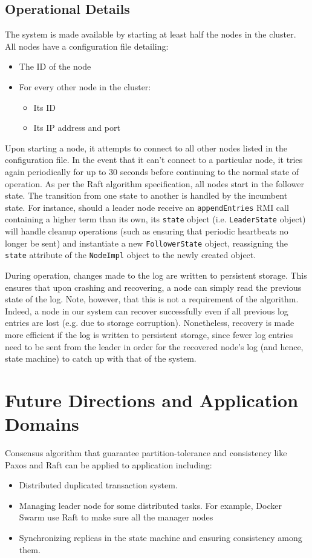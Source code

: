\documentclass[12pt, a4paper]{article}
\begin{document}
\subsection{Operational Details}
The system is made available by starting at least half the nodes in the cluster. All nodes have a configuration file detailing:
\begin{itemize}
    \item The ID of the node
    \item For every other node in the cluster:
    \begin{itemize}
        \item Its ID
        \item Its IP address and port
    \end{itemize}
\end{itemize}
Upon starting a node, it attempts to connect to all other nodes listed in the configuration file. In the event that it can't connect to a particular node, it tries again periodically for up to 30 seconds before continuing to the normal state of operation. As per the Raft algorithm specification, all nodes start in the follower state. The transition from one state to another is handled by the incumbent state. For instance, should a leader node receive an \texttt{appendEntries} RMI call containing a higher term than its own, its \texttt{state} object (i.e. \texttt{LeaderState} object) will handle cleanup operations (such as ensuring that periodic heartbeats no longer be sent) and instantiate a new \texttt{FollowerState} object, reassigning the \texttt{state} attribute of the \texttt{NodeImpl} object to the newly created object.

During operation, changes made to the log are written to persistent storage. This ensures that upon crashing and recovering, a node can simply read the previous state of the log. Note, however, that this is not a requirement of the algorithm. Indeed, a node in our system can recover successfully even if all previous log entries are lost (e.g. due to storage corruption). Nonetheless, recovery is made more efficient if the log is written to persistent storage, since fewer log entries need to be sent from the leader in order for the recovered node's log (and hence, state machine) to catch up with that of the system.

\section{Future Directions and Application Domains}
Consensus algorithm that guarantee partition-tolerance and consistency like Paxos and Raft can be applied to application including:
\begin{itemize}
    \item Distributed duplicated transaction system.
    \item Managing leader node for some distributed tasks. For example, Docker Swarm use Raft to make sure all the manager nodes
    \item Synchronizing replicas in the state machine and ensuring consistency among them.
\end{itemize}



\end{document}
